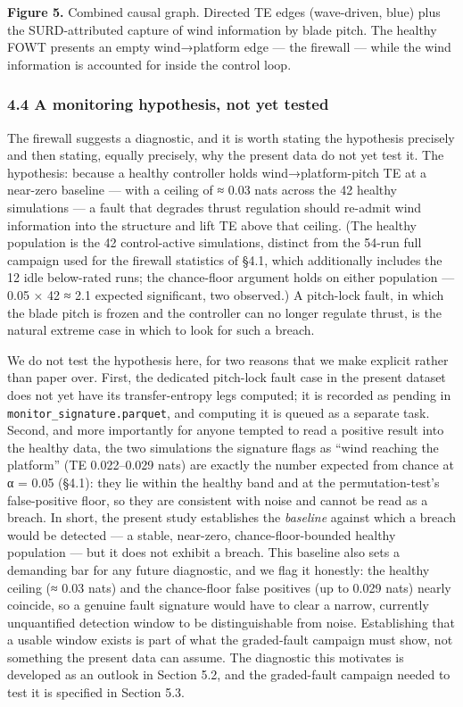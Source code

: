 \documentclass[
  english,
  11pt,
]{article}
\begin{document}
\textbf{Figure 5.} Combined causal graph. Directed TE edges
(wave-driven, blue) plus the SURD-attributed capture of wind information
by blade pitch. The healthy FOWT presents an empty wind→platform edge
--- the firewall --- while the wind information is accounted for inside
the control loop.

\subsubsection{4.4 A monitoring hypothesis, not yet
tested}\label{a-monitoring-hypothesis-not-yet-tested}

The firewall suggests a diagnostic, and it is worth stating the
hypothesis precisely and then stating, equally precisely, why the
present data do not yet test it. The hypothesis: because a healthy
controller holds wind→platform-pitch TE at a near-zero baseline --- with
a ceiling of ≈ 0.03 nats across the 42 healthy simulations --- a fault
that degrades thrust regulation should re-admit wind information into
the structure and lift TE above that ceiling. (The healthy population is
the 42 control-active simulations, distinct from the 54-run full
campaign used for the firewall statistics of §4.1, which additionally
includes the 12 idle below-rated runs; the chance-floor argument holds
on either population --- 0.05 × 42 ≈ 2.1 expected significant, two
observed.) A pitch-lock fault, in which the blade pitch is frozen and
the controller can no longer regulate thrust, is the natural extreme
case in which to look for such a breach.

We do not test the hypothesis here, for two reasons that we make
explicit rather than paper over. First, the dedicated pitch-lock fault
case in the present dataset does not yet have its transfer-entropy legs
computed; it is recorded as pending in
\texttt{monitor\_signature.parquet}, and computing it is queued as a
separate task. Second, and more importantly for anyone tempted to read a
positive result into the healthy data, the two simulations the signature
flags as ``wind reaching the platform'' (TE 0.022--0.029 nats) are
exactly the number expected from chance at α = 0.05 (§4.1): they lie
within the healthy band and at the permutation-test's false-positive
floor, so they are consistent with noise and cannot be read as a breach.
In short, the present study establishes the \emph{baseline} against
which a breach would be detected --- a stable, near-zero,
chance-floor-bounded healthy population --- but it does not exhibit a
breach. This baseline also sets a demanding bar for any future
diagnostic, and we flag it honestly: the healthy ceiling (≈ 0.03 nats)
and the chance-floor false positives (up to 0.029 nats) nearly coincide,
so a genuine fault signature would have to clear a narrow, currently
unquantified detection window to be distinguishable from noise.
Establishing that a usable window exists is part of what the
graded-fault campaign must show, not something the present data can
assume. The diagnostic this motivates is developed as an outlook in
Section 5.2, and the graded-fault campaign needed to test it is
specified in Section 5.3.
\end{document}

